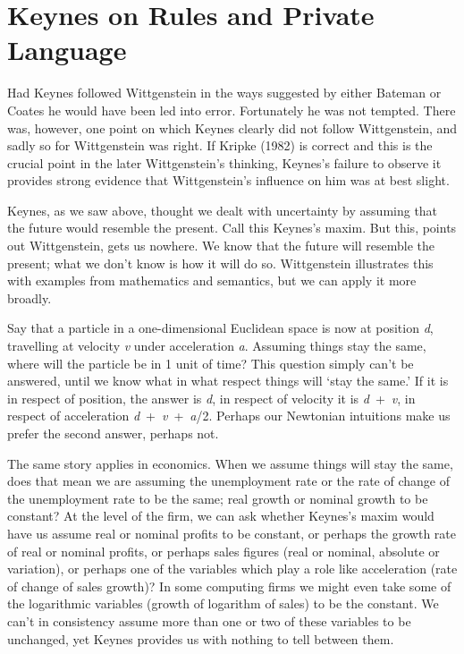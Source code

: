 \documentclass[noflushend]{philosophersimprint}
\begin{document}
\hypertarget{keynes-on-rules-and-private-language}{%
\section{Keynes on Rules and Private
Language}\label{keynes-on-rules-and-private-language}}

Had Keynes followed Wittgenstein in the ways suggested by either Bateman
or Coates he would have been led into error. Fortunately he was not
tempted. There was, however, one point on which Keynes clearly did not
follow Wittgenstein, and sadly so for Wittgenstein was right. If Kripke
(1982) is correct and this is the crucial point in the later
Wittgenstein's thinking, Keynes's failure to observe it provides strong
evidence that Wittgenstein's influence on him was at best slight.

Keynes, as we saw above, thought we dealt with uncertainty by assuming
that the future would resemble the present. Call this Keynes's maxim.
But this, points out Wittgenstein, gets us nowhere. We know that the
future will resemble the present; what we don't know is how it will do
so. Wittgenstein illustrates this with examples from mathematics and
semantics, but we can apply it more broadly.

Say that a particle in a one-dimensional Euclidean space is now at
position \emph{d}, travelling at velocity \emph{v} under acceleration
\emph{a}. Assuming things stay the same, where will the particle be in 1
unit of time? This question simply can't be answered, until we know what
in what respect things will `stay the same.' If it is in respect of
position, the answer is \emph{d}, in respect of velocity it is
\emph{d}~+~\emph{v}, in respect of acceleration
\emph{d}~+~\emph{v}~+~\emph{a}/2. Perhaps our Newtonian intuitions make
us prefer the second answer, perhaps not.

The same story applies in economics. When we assume things will stay the
same, does that mean we are assuming the unemployment rate or the rate
of change of the unemployment rate to be the same; real growth or
nominal growth to be constant? At the level of the firm, we can ask
whether Keynes's maxim would have us assume real or nominal profits to
be constant, or perhaps the growth rate of real or nominal profits, or
perhaps sales figures (real or nominal, absolute or variation), or
perhaps one of the variables which play a role like acceleration (rate
of change of sales growth)? In some computing firms we might even take
some of the logarithmic variables (growth of logarithm of sales) to be
the constant. We can't in consistency assume more than one or two of
these variables to be unchanged, yet Keynes provides us with nothing to
tell between them.
\end{document}
